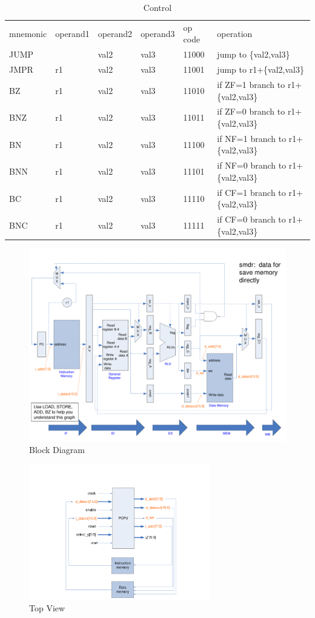 \documentclass[10pt,a4paper,fleqn]{article}
\begin{document}
\begin{table}[H]
  \def\tc{\color{blue}}
  \centering
  \begin{tabular}{llllll}
    \tc mnemonic&\tc operand1&\tc operand2&\tc operand3&\tc op code&\tc operation \\
     JUMP& &val2&val3&11000&jump to \{val2,val3\}\\
     JMPR&r1&val2&val3&11001&jump to r1+\{val2,val3\}\\
     BZ&r1&val2&val3&11010&if ZF=1 branch to r1+\{val2,val3\}\\
     BNZ&r1&val2&val3&11011&if ZF=0 branch to r1+\{val2,val3\}\\
     BN&r1&val2&val3&11100&if NF=1 branch to r1+\{val2,val3\}\\
     BNN&r1&val2&val3&11101&if NF=0 branch to r1+\{val2,val3\}\\
     BC&r1&val2&val3&11110&if CF=1 branch to r1+\{val2,val3\}\\
     BNC&r1&val2&val3&11111&if CF=0 branch to r1+\{val2,val3\}\\
  \end{tabular}
  \caption{Control}
\end{table}
\begin{figure}[H]
  \centering
  \includegraphics[width=\textwidth]{figure/blockdiagram.pdf}
  \caption{Block Diagram}
\end{figure}
\begin{figure}[H]
  \centering
  \includegraphics[width=0.7\textwidth]{figure/topview.pdf}
  \caption{Top View}
\end{figure}
\end{document}
